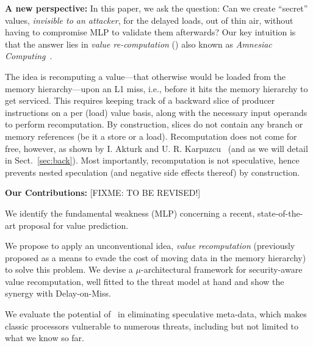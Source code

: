 \noindent \textbf{A new perspective:} In this paper, we ask the question: Can we create ``secret'' values, \emph{invisible to an attacker}, for the delayed loads, out of thin air, without having to compromise MLP to validate them afterwards? Our key intuition is that the answer lies in \emph{value re-computation} (\emph{\recomp})
also known as \emph{Amnesiac Computing}~\cite{amnesiac17}.

The idea is recomputing a value---that otherwise would be loaded from the memory hierarchy---upon an L1 miss, i.e., before it hits the memory hierarchy to get serviced. This requires keeping track of a backward slice of producer instructions on a per (load) value basis, along with the necessary input operands to perform recomputation. By construction, slices do not contain any branch or memory references (be it a store or a load). Recomputation does not come for free, however, as shown by  I. Akturk and U. R. Karpuzcu~\cite{amnesiac17} (and as we will detail in Sect.~\ref{sec:back}). %
Most importantly, recomputation is not speculative, hence prevents nested speculation (and negative side effects thereof) by construction.

\noindent \textbf{Our Contributions:} {\color{red} [FIXME: TO BE REVISED!]}
\squishlist
\item We identify the fundamental weakness (MLP) concerning a recent, state-of-the-art proposal for value prediction. 
\item We propose to apply an unconventional idea, \emph{value recomputation} (previously proposed as a means to evade the cost of moving data in the memory hierarchy) to solve this problem. We devise a $\mu$-architectural framework for security-aware value recomputation, well fitted to the 
threat model at hand and show the synergy with Delay-on-Miss.
\item We evaluate the potential of \recomp\ in eliminating speculative meta-data, which makes classic processors vulnerable to numerous threats, including but not limited to what we know so far.  
\squishend

